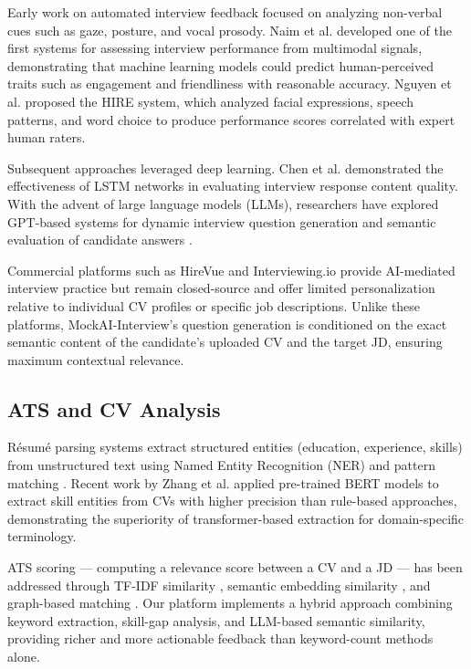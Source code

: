 \documentclass[pdflatex,sn-mathphys-num]{sn-jnl}%
\theoremstyle{thmstyleone}%
\theoremstyle{thmstyletwo}%
\theoremstyle{thmstylethree}%
\begin{document}
Early work on automated interview feedback focused on analyzing non-verbal cues such as gaze, posture, and vocal prosody. Naim et al. \cite{naim2015automated} developed one of the first systems for assessing interview performance from multimodal signals, demonstrating that machine learning models could predict human-perceived traits such as engagement and friendliness with reasonable accuracy. Nguyen et al. \cite{nguyen2014hire} proposed the HIRE system, which analyzed facial expressions, speech patterns, and word choice to produce performance scores correlated with expert human raters.

Subsequent approaches leveraged deep learning. Chen et al. \cite{chen2017automated} demonstrated the effectiveness of LSTM networks in evaluating interview response content quality. With the advent of large language models (LLMs), researchers have explored GPT-based systems for dynamic interview question generation \cite{guo2022automated} and semantic evaluation of candidate answers \cite{liu2023interview}.

Commercial platforms such as HireVue and Interviewing.io provide AI-mediated interview practice but remain closed-source and offer limited personalization relative to individual CV profiles or specific job descriptions. Unlike these platforms, MockAI-Interview's question generation is conditioned on the exact semantic content of the candidate's uploaded CV and the target JD, ensuring maximum contextual relevance.

\subsection{ATS and CV Analysis}\label{subsec2-2}

Résumé parsing systems extract structured entities (education, experience, skills) from unstructured text using Named Entity Recognition (NER) and pattern matching \cite{kopparapu2010automatic}. Recent work by Zhang et al. \cite{zhang2022resume} applied pre-trained BERT models to extract skill entities from CVs with higher precision than rule-based approaches, demonstrating the superiority of transformer-based extraction for domain-specific terminology.

ATS scoring — computing a relevance score between a CV and a JD — has been addressed through TF-IDF similarity \cite{salton1988term}, semantic embedding similarity \cite{reimers2019sentence}, and graph-based matching \cite{li2021resume}. Our platform implements a hybrid approach combining keyword extraction, skill-gap analysis, and LLM-based semantic similarity, providing richer and more actionable feedback than keyword-count methods alone.
\end{document}
